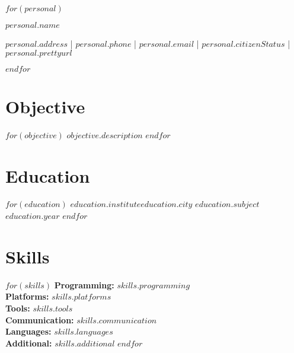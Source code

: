 \documentclass[$documentclass.fontsize$, $documentclass.papersize$]{$documentclass.class$}
\begin{document}
$for(personal)$
    \noindent
    \begin{centering} \Huge{$personal.name$} \\
    \end{centering}

    \vspace{.1cm}

    \begin{centering}
      \small
        {$personal.address$} |
        {$personal.phone$}   |
        {$personal.email$}   |
        {$personal.citizenStatus$} |
        {\href{$personal.website$}{$personal.prettyurl$}} \\
    \end{centering}
$endfor$

\vspace{-.5cm} %

\section*{Objective}
$for(objective)$
  {$objective.description$}
$endfor$

\vspace{-.5cm} %

\section*{Education}
  \subHeadingBulletListStart
    $for(education)$
      \subHeadingBulletListText
        {$education.institute$}{$education.city$}
        {$education.subject$}{$education.year$}
    $endfor$
  \subHeadingBulletListEnd

\vspace{-.5cm} %

\section*{Skills}
  $for(skills)$ %
      \textbf{Programming:} {$skills.programming$} \\
      \textbf{Platforms:} {$skills.platforms$} \\
      \textbf{Tools:} {$skills.tools$} \\
      \textbf{Communication:} {$skills.communication$} \\
      \textbf{Languages:} {$skills.languages$} \\
      \textbf{Additional:} {$skills.additional$}
  $endfor$
\end{document}
